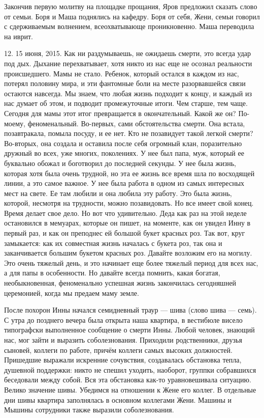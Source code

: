 Закончив первую молитву на площадке прощания, Яров предложил сказать слово от семьи. Боря и Маша поднялись на кафедру. Боря от себя, Жени, семьи говорил с сдерживаемым волнением, всеохватывающе проникновенно. Маша переводила на иврит.

12. 15 июня, 2015. Как ни раздумываешь, не ожидаешь смерти, это всегда удар под дых. Дыхание перехватывает, хотя никто из нас еще не осознал реальности происшедшего. Мамы не стало. Ребенок, который остался в каждом из нас, потерял половину мира, и эти фантомные боли на месте разорвавшейся связи остаются навсегда. Мы знаем, что любая жизнь подходит к концу, и каждый из нас думает об этом, и подводит промежуточные итоги. Чем старше, тем чаще. Сегодня для мамы этот итог превращается в окончательный. Какой же он? По-моему, феноменальный. Во-первых, сами обстоятельства смерти. Она встала, позавтракала, помыла посуду, и ее нет. Кто не позавидует такой легкой смерти? Во-вторых, она создала и оставила после себя огромный клан, поразительно дружный во всех, уже многих, поколениях. У нее был папа, муж, который ее буквально обожал и боготворил до последней секунды. У нее была жизнь, которая хотя была очень трудной, но эта ее жизнь все время шла по восходящей линии, а это самое важное. У нее была работа в одном из самых интересных мест на свете. Ее там любили и она любила эту работу. Это была жизнь, которой, несмотря на трудности, можно позавидовать. Но все имеет свой конец. Время делает свое дело. Но вот что удивительно. Деда как раз на этой неделе остановился в мемуарах, которые он пишет, на моменте, как он увидел Инну в первый раз, и как он преподнес ей большой букет красных роз. Так вот, круг замыкается: как их совместная жизнь началась с букета роз, так она и заканчивается большим букетом красных роз. Давайте возложим его на могилу. Это очень тяжелый день, и это начинает еще более тяжелый период для всех нас, а для папы в особенности. Но давайте всегда помнить, какая богатая, необыкновенная, феноменально успешная жизнь закончилась сегодняшней церемонией, когда мы предаем маму земле.

После похорон Инны начался семидневный траур — шива (слово шива — семь). С утра до позднего вечера была открыта наша квартира, в вестибюле висело типографски выполненное сообщение о смерти Инны. Любой человек, знающий нас, мог зайти и выразить соболезнования. Приходили родственники, друзья сыновей, коллеги по работе, причём коллеги самых высоких должностей. Пришедшие выражали искренние сочувствия, создавалась обстановка тепла, душевной поддержки: никто не спешил уходить, наоборот, группки собравшихся беседовали между собой. Вся эта обстановка как-то уравновешивала ситуацию. Велико значение шивы. Убедимся на отношении к Жене его коллег. В отдельные дни шивы квартира заполнялась в основном коллегами Жени. Машины и Мышины сотрудники также выразили соболезнования.

